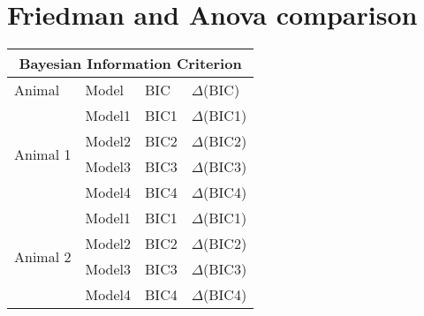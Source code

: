 \chapter{Friedman and Anova comparison}
\label{app:FriedAnova}
\begin{table}[h!]
    \centering
\begin{tabular}{ |p{3cm}||p{3cm}|p{2cm}|p{2cm}| }
 \hline
 \multicolumn{4}{|c|}{Bayesian Information Criterion} \\
 \hline
 Animal & Model & BIC & $\Delta$(BIC)\\
 \hline
\multirow{4}{6cm}{Animal 1} &Model1&BIC1&$\Delta$(BIC1)\\&Model2&BIC2&$\Delta$(BIC2)\\&Model3&BIC3&$\Delta$(BIC3)\\&Model4&BIC4&$\Delta$(BIC4)\\
\hline
\multirow{4}{6cm}{Animal 2} &Model1&BIC1&$\Delta$(BIC1)\\&Model2&BIC2&$\Delta$(BIC2)\\&Model3&BIC3&$\Delta$(BIC3)\\&Model4&BIC4&$\Delta$(BIC4)\\
 \hline
\end{tabular}
\end{table}